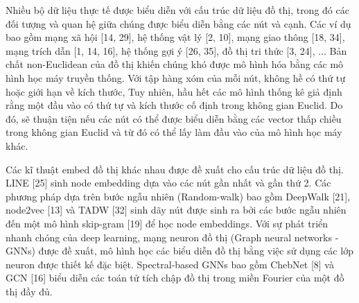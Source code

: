 Nhiều bộ dữ liệu thực tế được biểu diễn với cấu trúc dữ liệu đồ thị, trong đó các đối tượng và quan hệ giữa chúng được biểu diễn bằng các nút và cạnh. Các ví dụ bao gồm mạng xã hội [14, 29], hệ thống vật lý [2, 10], mạng giao thông [18, 34], mạng trích dẫn [1, 14, 16], hệ thống gợi ý [26, 35], đồ thị tri thức [3, 24], ... Bản chất non-Euclidean của đồ thị khiến chúng khó được mô hình hóa bằng các mô hình học máy truyền thống. Với tập hàng xóm của mỗi nút, không hề có thứ tự hoặc giới hạn về kích thước, Tuy nhiên, hầu hết các mô hình thống kê giả định rằng một đầu vào có thứ tự và kích thước cố định trong không gian Euclid. Do đó, sẽ thuận tiện nếu các nút có thể được biểu diễn bằng các vector thấp chiều trong không gian Euclid và từ đó có thể lấy làm đầu vào của mô hình học máy khác. 

Các kĩ thuật embed đồ thị khác nhau được đề xuất cho cấu trúc dữ liệu đồ thị. LINE [25] sinh node embedding dựa vào các nút gần nhất và gần thứ 2. Các phương pháp dựa trên bước ngẫu nhiên (Random-walk) bao gồm DeepWalk [21], node2vec [13] và TADW [32] sinh dãy nút được sinh ra bởi các bước ngẫu nhiên đến một mô hình skip-gram [19] để học node embeddings. Với sự phát triển nhanh chóng của deep learning, mạng neuron đồ thị (Graph neural networks - GNNs) được đề xuất, mô hình học các biểu diễn đồ thị bằng việc sử dụng các lớp neuron được thiết kế đặc biệt. Spectral-based GNNs bao gồm ChebNet [8] và GCN [16] biểu diễn các toán tử tích chập đồ thị trong miền Fourier của một đồ thị đầy đủ.